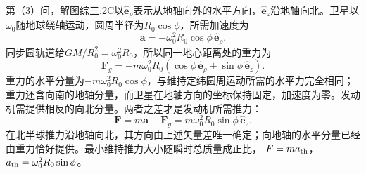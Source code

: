 \documentclass[UTF8,fontset=fandol,a4paper,11pt]{ctexart}
\begin{document}
第（3）问，解图综三.2C以$\hat{\boldsymbol e}_\rho$表示从地轴向外的水平方向，$\hat{\boldsymbol e}_z$沿地轴向北。卫星以$\omega_0$随地球绕轴运动，圆周半径为$R_0\cos\phi$，所需加速度为
\[
\boldsymbol a=-\omega_0^2R_0\cos\phi\,
\hat{\boldsymbol e}_\rho.
\]
同步圆轨道给$GM/R_0^2=\omega_0^2R_0$，所以同一地心距离处的重力为
\[
\boldsymbol F_g=-m\omega_0^2R_0
(\cos\phi\,\hat{\boldsymbol e}_\rho+
\sin\phi\,\hat{\boldsymbol e}_z).
\]
重力的水平分量为$-m\omega_0^2R_0\cos\phi$，与维持定纬圆周运动所需的水平力完全相同；重力还含向南的地轴分量，而卫星在地轴方向的坐标保持固定，加速度为零。发动机需提供相反的向北分量。两者之差才是发动机所需推力：
\[
\boxed{\boldsymbol F=m\boldsymbol a-\boldsymbol F_g
=m\omega_0^2R_0\sin\phi\,\hat{\boldsymbol e}_z}.
\]
在北半球推力沿地轴向北，其方向由上述矢量差唯一确定；向地轴的水平分量已经由重力恰好提供。最小维持推力大小随瞬时总质量成正比，
$F=ma_{\rm th}$，$a_{\rm th}=\omega_0^2R_0\sin\phi$。
\end{document}
